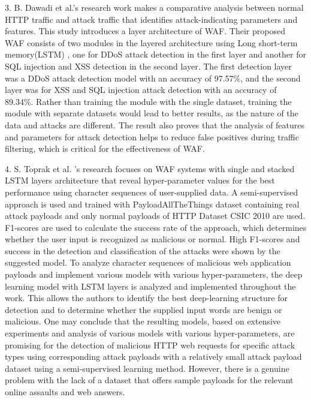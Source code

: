 3.	B. Dawadi et al.\cite{Dawadi}'s research work makes a comparative analysis between normal HTTP traffic and attack traffic that identifies attack-indicating parameters and features. This study introduces a layer architecture of WAF. Their proposed WAF consists of two modules in the layered architecture using Long short-term memory(LSTM) , one for DDoS attack detection in the first layer and another for SQL injection and XSS detection in the second layer. The first detection layer was a DDoS attack detection model with an accuracy of 97.57\%, and the second layer was for XSS and SQL injection attack detection with an accuracy of 89.34\%. Rather than training the module with the single dataset, training the module with separate datasets would lead to better results, as the nature of the data and attacks are different. The result also proves that the analysis of features and parameters for attack detection helps to reduce false positives during traffic filtering, which is critical for the effectiveness of WAF.


4.	S. Toprak et al. \cite{Toprak}'s research focuses on WAF systems with single and stacked LSTM layers architecture that reveal hyper-parameter values for the best performance using character sequences of user-supplied data. A semi-supervised approach is used and trained with PayloadAllTheThings dataset containing real attack payloads and only normal payloads of HTTP Dataset CSIC 2010 are used. F1-scores are used to calculate the success rate of the approach, which determines whether the user input is recognized as malicious or normal. High F1-scores and success in the detection and classification of the attacks were shown by the suggested model.
To analyze character sequences of malicious web application payloads and implement various models with various hyper-parameters, the deep learning model with LSTM layers is analyzed and implemented throughout the work. This allows the authors to identify the best deep-learning structure for detection and to determine whether the supplied input words are benign or malicious. One may conclude that the resulting models, based on extensive experiments and analysis of various models with various hyper-parameters, are promising for the detection of malicious HTTP web requests for specific attack types using corresponding attack payloads with a relatively small attack payload dataset using a semi-supervised learning method. However, there is a genuine problem with the lack of a dataset that offers sample payloads for the relevant online assaults and web answers.

